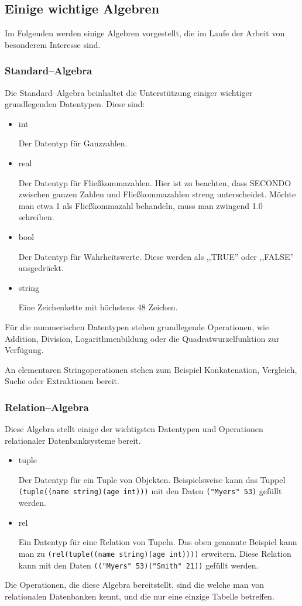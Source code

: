 \subsection{Einige wichtige Algebren}

Im Folgenden werden einige Algebren vorgestellt, die im Laufe der Arbeit von besonderem Interesse sind. 

\subsubsection{Standard--Algebra}
Die Standard--Algebra beinhaltet die Unterstützung einiger wichtiger grundlegenden Datentypen. Diese sind:
\begin{itemize}
\item int

Der Datentyp für Ganzzahlen.
\item real

Der Datentyp für Fließkommazahlen. Hier ist zu beachten, dass SECONDO zwischen ganzen Zahlen und Fließkommazahlen streng unterscheidet. Möchte man etwa 1 als Fließkommazahl behandeln, muss man zwingend 1.0 schreiben.
\item bool

Der Datentyp für Wahrheitswerte. Diese werden als ,,TRUE'' oder ,,FALSE'' ausgedrückt.
\item string

Eine Zeichenkette mit höchstens 48 Zeichen. 
\end{itemize}

Für die nummerischen Datentypen stehen grundlegende Operationen, wie Addition, Division, Logarithmenbildung oder die Quadratwurzelfunktion zur Verfügung.

An elementaren Stringoperationen stehen zum Beispiel Konkatenation, Vergleich, Suche oder Extraktionen bereit.

\subsubsection{Relation--Algebra}

Diese Algebra stellt einige der wichtigsten Datentypen und Operationen relationaler Datenbanksysteme bereit.
 
\begin{itemize}
\item tuple

Der Datentyp für ein Tuple von Objekten. Beispielsweise kann das Tuppel\\ \verb+(tuple((name string)(age int)))+ mit den Daten \verb+("Myers" 53)+ gefüllt werden.
\item rel

Ein Datentyp für eine Relation von Tupeln. Das oben genannte Beispiel kann man zu \verb+(rel(tuple((name string)(age int))))+ erweitern. Diese Relation kann mit den Daten \verb+(("Myers" 53)("Smith" 21))+ gefüllt werden.
\end{itemize}
Die Operationen, die diese Algebra bereitstellt, sind die welche man von relationalen Datenbanken kennt, und die nur eine einzige Tabelle betreffen.

